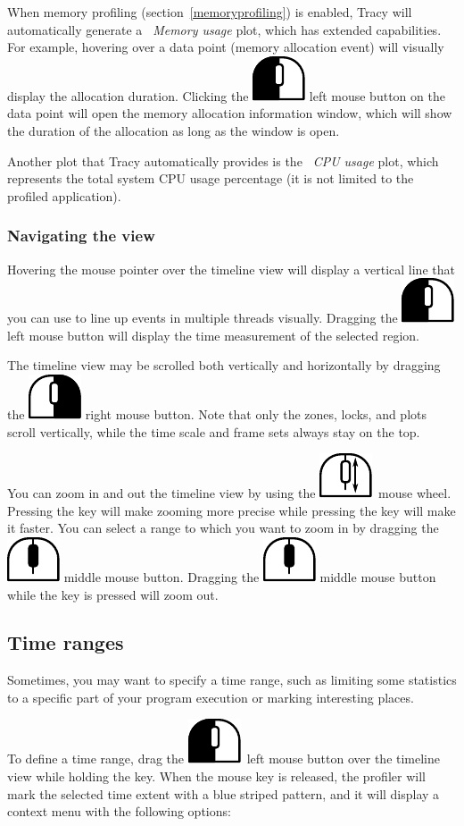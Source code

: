 \documentclass[hidelinks,titlepage,a4paper]{article}
\newcommand{\LMB}{\includegraphics[height=.8\baselineskip]{icons/lmb}}
\newcommand{\RMB}{\includegraphics[height=.8\baselineskip]{icons/rmb}}
\newcommand{\MMB}{\includegraphics[height=.8\baselineskip]{icons/mmb}}
\newcommand{\Scroll}{\includegraphics[height=.8\baselineskip]{icons/scroll}}
\begin{document}
When memory profiling (section~\ref{memoryprofiling}) is enabled, Tracy will automatically generate a \emph{\faMemory{}~Memory usage} plot, which has extended capabilities. For example, hovering over a data point (memory allocation event) will visually display the allocation duration. Clicking the \LMB{} left mouse button on the data point will open the memory allocation information window, which will show the duration of the allocation as long as the window is open.

Another plot that Tracy automatically provides is the \emph{\faTachometer*{}~CPU usage} plot, which represents the total system CPU usage percentage (it is not limited to the profiled application).

\subsubsection{Navigating the view}

Hovering the \faMousePointer{} mouse pointer over the timeline view will display a vertical line that you can use to line up events in multiple threads visually. Dragging the \LMB{} left mouse button will display the time measurement of the selected region.

The timeline view may be scrolled both vertically and horizontally by dragging the \RMB{} right mouse button. Note that only the zones, locks, and plots scroll vertically, while the time scale and frame sets always stay on the top.

You can zoom in and out the timeline view by using the \Scroll{}~mouse wheel. Pressing the \keys{\ctrl} key will make zooming more precise while pressing the \keys{\shift} key will make it faster. You can select a range to which you want to zoom in by dragging the \MMB{} middle mouse button. Dragging the \MMB{} middle mouse button while the \keys{\ctrl} key is pressed will zoom out.

\subsection{Time ranges}
\label{timeranges}

Sometimes, you may want to specify a time range, such as limiting some statistics to a specific part of your program execution or marking interesting places.

To define a time range, drag the \LMB{}~left mouse button over the timeline view while holding the \keys{\ctrl} key. When the mouse key is released, the profiler will mark the selected time extent with a blue striped pattern, and it will display a context menu with the following options:
\end{document}
